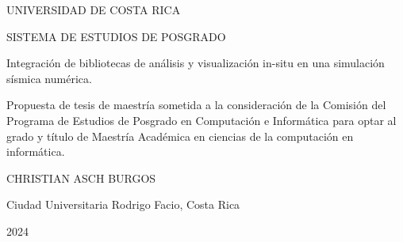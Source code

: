 \begin{titlepage}
  \begin{center}
    UNIVERSIDAD DE COSTA RICA

    SISTEMA DE ESTUDIOS DE POSGRADO

    \vspace{2.5cm}
    Integración de bibliotecas de análisis y visualización in-situ en una simulación sísmica numérica.

    \vspace{2.5cm}
    Propuesta de tesis de maestría sometida a la consideración de la Comisión del Programa de Estudios de Posgrado en Computación e Informática para optar al grado y título de Maestría Académica en ciencias de la computación en informática.

    \vspace{2.5cm}
    CHRISTIAN ASCH BURGOS

    \vspace{4.5cm}
    Ciudad Universitaria Rodrigo Facio, Costa Rica

    2024

  \end{center}
\end{titlepage}
